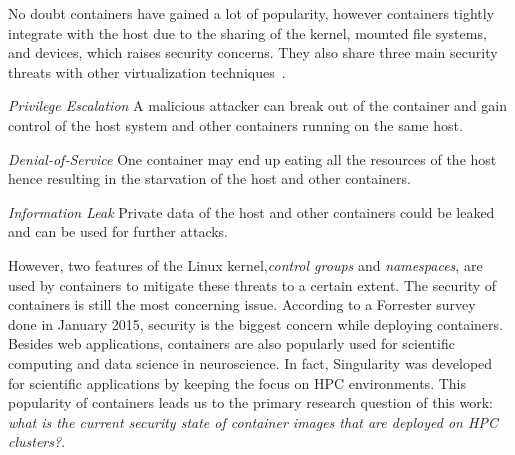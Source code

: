 \documentclass[a4paper,num-refs]{oup-contemporary}
\begin{document}
No doubt containers have gained a lot of popularity, however containers tightly
integrate with the host due to the sharing of the kernel, 
mounted file systems, and devices, which raises security
concerns.
They also share three main security threats with other virtualization
techniques~\cite{gantikow2016providing}.

\textit{Privilege Escalation} A malicious attacker can break out of the container
and gain control of the host system and other containers running on the same host.

\textit{Denial-of-Service} One container may end up eating all the resources of the
host hence resulting in the starvation of the host and other containers.

\textit{Information Leak} Private data of the host and other containers could be
leaked and can be used for further attacks.


However, two features of the Linux kernel,\textit{control groups} and \textit{namespaces},
are used by containers to mitigate these threats to a certain extent. The security
of containers is still the most concerning issue. According to a Forrester survey~\cite{bettini2015vulnerability}
done in January 2015, security is the
biggest concern while deploying containers.
Besides web applications, containers are also popularly used for scientific computing
and data science in neuroscience. In fact, Singularity was developed for scientific applications
by keeping the focus on HPC environments. This popularity of containers leads us to the
primary research question of this work: \textit{what is the current security state of
container images that are deployed on HPC clusters?}.
\end{document}
